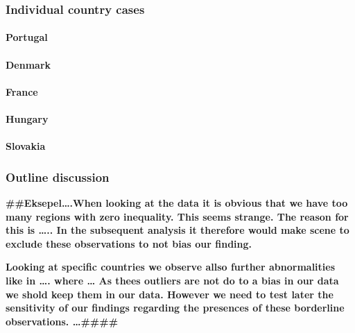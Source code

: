 \documentclass[
  a4paper,
  DIV=11,
  numbers=noendperiod]{scrartcl}
\let\oldparagraph\paragraph
\renewcommand{\paragraph}[1]{\oldparagraph{#1}\mbox{}}
\begin{document}
\hypertarget{individual-country-cases}{%
\subsubsection{Individual country
cases}\label{individual-country-cases}}

\hypertarget{portugal-1}{%
\paragraph{Portugal}\label{portugal-1}}

\hypertarget{denmark-1}{%
\paragraph{Denmark}\label{denmark-1}}

\hypertarget{france-1}{%
\paragraph{France}\label{france-1}}

\hypertarget{hungary-1}{%
\paragraph{Hungary}\label{hungary-1}}

\hypertarget{slovakia-1}{%
\paragraph{Slovakia}\label{slovakia-1}}

\hypertarget{outline-discussion}{%
\subsubsection{\texorpdfstring{\textbf{Outline
discussion}}{Outline discussion}}\label{outline-discussion}}

\textbf{\#\#Eksepel\ldots.When looking at the data it is obvious that we
have too many regions with zero inequality. This seems strange. The
reason for this is \ldots.. In the subsequent analysis it therefore
would make scene to exclude these observations to not bias our finding.}

\textbf{Looking at specific countries we observe allso further
abnormalities like in \ldots. where \ldots{} As thees outliers are not
do to a bias in our data we shold keep them in our data. However we need
to test later the sensitivity of our findings regarding the presences of
these borderline observations. \ldots\#\#\#\#}
\end{document}
